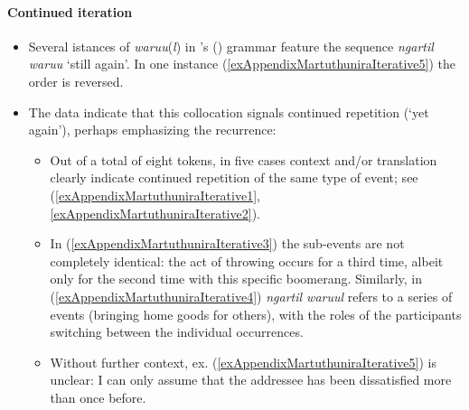 \paragraph{Continued iteration}
\label{appendixMartuthuniraContinuedIteration}
\begin{itemize}
	\item Several istances of \textit{waruu}(\textit{l}) in \citeauthor{Dench1994}'s (\citeyear{Dench1994}) grammar feature the sequence \textit{ngartil waruu} \lq still again'. In one instance (\ref{exAppendixMartuthuniraIterative5}) the order is reversed.
	\item The data indicate that this collocation signals continued repetition (\lq yet again'), perhaps emphasizing the recurrence:
	\begin{itemize}
		\item Out of a total of eight tokens, in five cases context and/or translation clearly indicate continued repetition of the same type of event; see (\ref{exAppendixMartuthuniraIterative1}, \ref{exAppendixMartuthuniraIterative2}).
		\item In (\ref{exAppendixMartuthuniraIterative3}) the sub-events are not completely identical: the act of throwing occurs for a third time, albeit only for the second time with this specific boomerang. Similarly, in (\ref{exAppendixMartuthuniraIterative4}) \textit{ngartil waruul} refers to a series of events (bringing home goods for others), with the roles of the participants switching between the individual occurrences.
		\item Without further context, ex. (\ref{exAppendixMartuthuniraIterative5}) is unclear: I can only assume that the addressee has been dissatisfied more than once before.
	\end{itemize}
\end{itemize}
